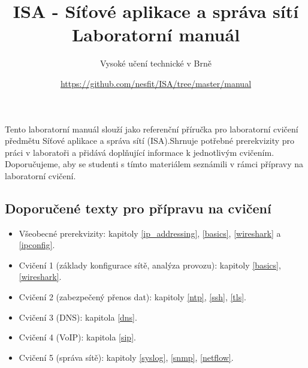 \documentclass[a4paper,11pt]{article}
\title{ISA - Síťové aplikace a správa sítí\\
{\bf\large Laboratorní manuál}}
\author{Vysoké učení technické v Brně}
\date{\url{https://github.com/nesfit/ISA/tree/master/manual}}
\begin{document}
{\let\newpage\relax\maketitle}

Tento laboratorní manuál slouží jako referenční příručka pro laboratorní cvičení předmětu Síťové aplikace a správa sítí (ISA).Shrnuje potřebné prerekvizity pro práci v laboratoři a přidává doplňující informace k jednotlivým cvičením. Doporučujeme, aby se studenti s tímto materiálem seznámili v rámci přípravy na laboratorní cvičení. 

\subsection*{Doporučené texty pro přípravu na cvičení}
\begin{itemize}
  \item Všeobecné prerekvizity: kapitoly \ref{ip_addressing}, \ref{basics}, \ref{wireshark} a \ref{ipconfig}.
  \item Cvičení 1 (základy konfigurace sítě, analýza provozu): kapitoly \ref{basics}, \ref{wireshark}.
  \item Cvičení 2 (zabezpečený přenos dat): kapitoly \ref{ntp}, \ref{ssh}, \ref{tls}.
  \item Cvičení 3 (DNS): kapitola \ref{dns}.
  \item Cvičení 4 (VoIP): kapitola \ref{sip}.
  \item Cvičení 5 (správa sítě): kapitoly \ref{syslog}, \ref{snmp}, \ref{netflow}. 
\end{itemize}

\setcounter{tocdepth}{1}
\tableofcontents
\enlargethispage{3mm}
\newpage


\newpage

\newpage

\newpage

\newpage

\newpage

\newpage

\newpage

\newpage

\newpage


\newpage




\newpage
\thispagestyle{empty}
\end{document}
